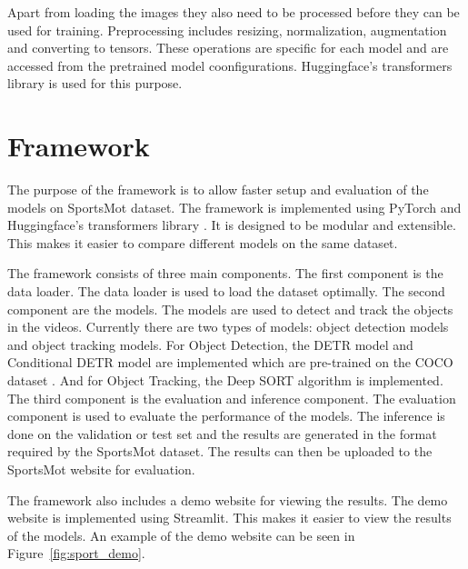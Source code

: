 \documentclass[runningheads]{llncs}
\begin{document}
Apart from loading the images they also need to be processed before they can be used for training.
Preprocessing includes resizing, normalization, augmentation and converting to tensors.
These operations are specific for each model and are accessed from the pretrained model coonfigurations.
Huggingface's transformers library \cite{wolf-etal-2020-transformers} is used for this purpose.


\section{Framework}
The purpose of the framework is to allow faster setup and evaluation of the models on SportsMot dataset.
The framework is implemented using PyTorch \cite{pytorch2019} and Huggingface's transformers library \cite{wolf-etal-2020-transformers}.
It is designed to be modular and extensible.
This makes it easier to compare different models on the same dataset.

The framework consists of three main components.
The first component is the data loader.
The data loader is used to load the dataset optimally.
The second component are the models.
The models are used to detect and track the objects in the videos.
Currently there are two types of models: object detection models and object tracking models.
For Object Detection, the DETR model \cite{detr2020} and Conditional DETR model \cite{conditionaldetr2021} are implemented which are pre-trained on the COCO dataset \cite{coco2014}.
And for Object Tracking, the Deep SORT algorithm \cite{DBLP:journals/corr/abs-1907-03465} is implemented.
The third component is the evaluation and inference component.
The evaluation component is used to evaluate the performance of the models.
The inference is done on the validation or test set and the results are generated in the format required by the SportsMot dataset.
The results can then be uploaded to the SportsMot website for evaluation.

The framework also includes a demo website for viewing the results.
The demo website is implemented using Streamlit.
This makes it easier to view the results of the models.
An example of the demo website can be seen in Figure~\ref{fig:sport_demo}.
\end{document}
